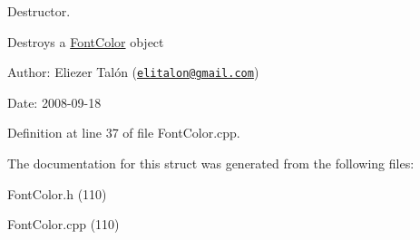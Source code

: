 Destructor. 

Destroys a \hyperlink{struct_font_color}{FontColor} object

\begin{Desc}
\item[Author:]Eliezer Talón (\href{mailto:elitalon@gmail.com}{\tt elitalon@gmail.com}) \end{Desc}
\begin{Desc}
\item[Date:]2008-09-18 \end{Desc}


Definition at line 37 of file FontColor.cpp.

The documentation for this struct was generated from the following files:\begin{CompactItemize}
\item 
FontColor.h (110)\item 
FontColor.cpp (110)\end{CompactItemize}
